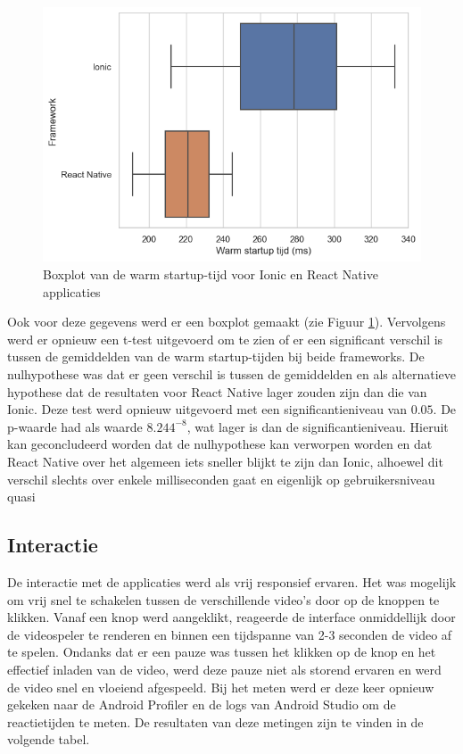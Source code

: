 \begin{figure}
  \centering
  \includegraphics[width=0.7\linewidth]{img/boxplotWarm}
  \caption{Boxplot van de warm startup-tijd voor Ionic en React Native applicaties}
  \label{fig:Boxplot van de warm startup-tijd voor Ionic en React Native applicaties}
\end{figure}

Ook voor deze gegevens werd er een boxplot gemaakt (zie Figuur \ref{fig:Boxplot van de warm startup-tijd voor Ionic en React Native applicaties}). Vervolgens werd er opnieuw een t-test uitgevoerd om te zien of er een significant verschil is tussen de gemiddelden van de warm startup-tijden bij beide frameworks. De nulhypothese was dat er geen verschil is tussen de gemiddelden en als alternatieve hypothese dat de resultaten voor React Native lager zouden zijn dan die van Ionic. Deze test werd opnieuw uitgevoerd met een significantieniveau van \(0.05\). De p-waarde had als waarde \(8.244^{-8}\), wat lager is dan de significantieniveau. Hieruit kan geconcludeerd worden dat de nulhypothese kan verworpen worden en dat React Native over het algemeen iets sneller blijkt te zijn dan Ionic, alhoewel dit verschil slechts over enkele milliseconden gaat en eigenlijk op gebruikersniveau quasi 


\subsection{Interactie}
\label{subsec:interactie}

De interactie met de applicaties werd als vrij responsief ervaren. Het was mogelijk om vrij snel te schakelen tussen de verschillende video's door op de knoppen te klikken. Vanaf een knop werd aangeklikt, reageerde de interface onmiddellijk door de videospeler te renderen en binnen een tijdspanne van 2-3 seconden de video af te spelen. Ondanks dat er een pauze was tussen het klikken op de knop en het effectief inladen van de video, werd deze pauze niet als storend ervaren en werd de video snel en vloeiend afgespeeld. Bij het meten werd er deze keer opnieuw gekeken naar de Android Profiler en de logs van Android Studio om de reactietijden te meten. De resultaten van deze metingen zijn te vinden in de volgende tabel.

